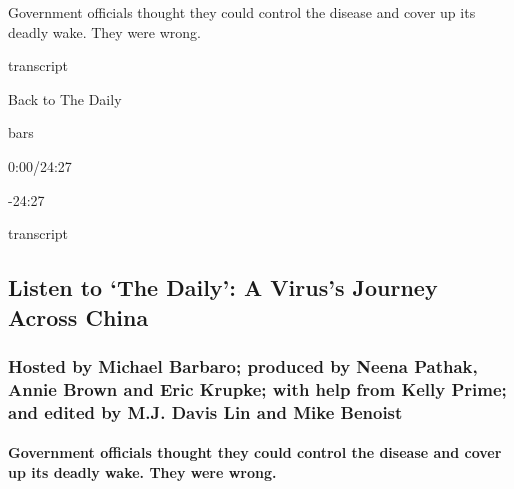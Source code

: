 Government officials thought they could control the disease and cover up
its deadly wake. They were wrong.

transcript

Back to The Daily

bars

0:00/24:27

-24:27

transcript

\hypertarget{listen-to-the-daily-a-viruss-journey-across-china-1}{%
\subsection{Listen to `The Daily': A Virus's Journey Across
China}\label{listen-to-the-daily-a-viruss-journey-across-china-1}}

\hypertarget{hosted-by-michael-barbaro-produced-by-neena-pathak-annie-brown-and-eric-krupke-with-help-from-kelly-prime-and-edited-by-mj-davis-lin-and-mike-benoist}{%
\subsubsection{Hosted by Michael Barbaro; produced by Neena Pathak,
Annie Brown and Eric Krupke; with help from Kelly Prime; and edited by
M.J. Davis Lin and Mike
Benoist}\label{hosted-by-michael-barbaro-produced-by-neena-pathak-annie-brown-and-eric-krupke-with-help-from-kelly-prime-and-edited-by-mj-davis-lin-and-mike-benoist}}

\hypertarget{government-officials-thought-they-could-control-the-disease-and-cover-up-its-deadly-wake-they-were-wrong}{%
\paragraph{Government officials thought they could control the disease
and cover up its deadly wake. They were
wrong.}\label{government-officials-thought-they-could-control-the-disease-and-cover-up-its-deadly-wake-they-were-wrong}}

